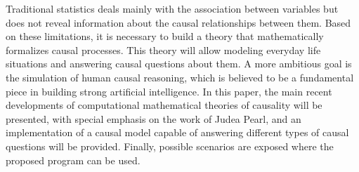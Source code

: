\begin{english_abstract}
	Traditional statistics deals mainly with the association between variables but does not reveal information about the causal relationships between them. Based on these limitations, it is necessary to build a theory that mathematically formalizes causal processes. This theory will allow modeling everyday life situations and answering causal questions about them. A more ambitious goal is the simulation of human causal reasoning, which is believed to be a fundamental piece in building strong artificial intelligence. In this paper, the main recent developments of computational mathematical theories of causality will be presented, with special emphasis on the work of Judea Pearl, and an implementation of a causal model capable of answering different types of causal questions will be provided. Finally, possible scenarios are exposed where the proposed program can be used.
\end{english_abstract}